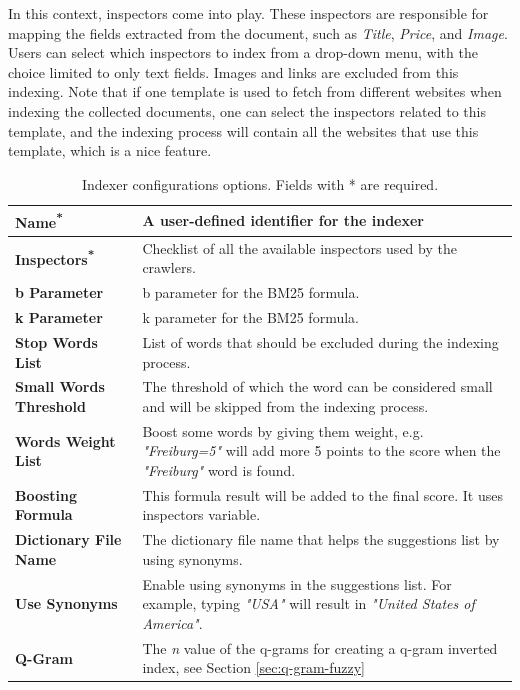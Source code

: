In this context, inspectors come into play. These inspectors are responsible for mapping the fields extracted from the document, such as \textit{Title}, \textit{Price}, and \textit{Image}. Users can select which inspectors to index from a drop-down menu, with the choice limited to only text fields. Images and links are excluded from this indexing. Note that if one template is used to fetch from different websites when indexing the collected documents, one can select the inspectors related to this template, and the indexing process will contain all the websites that use this template, which is a nice feature.

\begin{table}[ht] 
\centering
{\footnotesize
\begin{tabular}{|P{2.5cm}|P{10.8cm}|}
 \hline 
\textbf{Name\textsuperscript{*}} & A user-defined identifier for the indexer\\ \hline
\textbf{Inspectors\textsuperscript{*}} & Checklist of all the available inspectors used by the crawlers. \T\B 
\\ 
\hline
\hline
\textbf{b Parameter} & b parameter for the BM25 formula. \T\B 
\\ 
\hline
\textbf{k Parameter} & k parameter for the BM25 formula. \T\B 
\\ 
\hline
\textbf{Stop Words List} & List of words that should be excluded during the indexing process. \T\B 
\\ 
\hline
\textbf{Small Words Threshold} & The threshold of which the word can be considered small and will be skipped from the indexing process. \T\B 
\\ 
\hline
\textbf{Words Weight List} & Boost some words by giving them weight, e.g. \textit{"Freiburg=5"} will add more 5 points to the score when the \textit{"Freiburg"} word is found. \T\B 
\\ 
\hline
\textbf{Boosting Formula} & This formula result will be added to the final score. It uses inspectors variable. \T\B 
\\ 
\hline
\textbf{Dictionary File Name} & The dictionary file name that helps the suggestions list by using synonyms.\\ \hline
\textbf{Use Synonyms} & Enable using synonyms in the suggestions list. For example, typing \textit{"USA"} will result in \textit{"United States of America"}.\\ \hline
\textbf{Q-Gram} & The \textit{n} value of the q-grams for creating a q-gram inverted index, see Section \ref{sec:q-gram-fuzzy}\\ \hline
    \end{tabular}
}
  \captionsetup{justification=centering,margin=2cm}
  \caption{Indexer configurations options. Fields with * are required.}
  \label{table:indexing-config}
\end{table}

